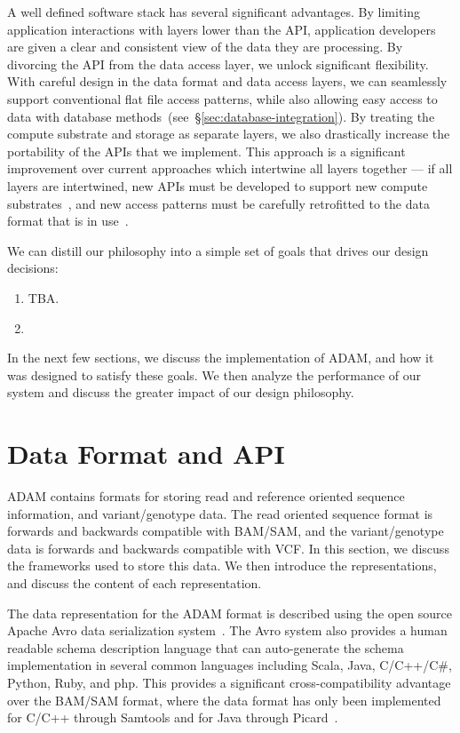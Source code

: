 \documentclass[10pt,twocolumn]{article}
\begin{document}
A well defined software stack has several significant advantages. By limiting application interactions with layers lower than the API,
application developers are given a clear and consistent view of the data they are processing. By divorcing the API from the data
access layer, we unlock significant flexibility. With careful design in the data format and data access layers, we can seamlessly
support conventional flat file access patterns, while also allowing easy access to data with database
methods~(see~\S\ref{sec:database-integration}). By treating the compute substrate and storage as separate layers, we also
drastically increase the portability of the APIs that we implement. This approach is a significant improvement over current approaches
which intertwine all layers together --- if all layers are intertwined, new APIs must be developed to support new compute
substrates~\cite{niemenmaa12}, and new access patterns must be carefully retrofitted to the data format that is in use~\cite{kozanitis13}.

We can distill our philosophy into a simple set of goals that drives our design decisions:

\begin{enumerate}
\item TBA.
\item 
\end{enumerate}

In the next few sections, we discuss the implementation of ADAM, and how it was designed to satisfy these goals. We then
analyze the performance of our system and discuss the greater impact of our design philosophy.

\section{Data Format and API}
\label{sec:data-format-and-api}

ADAM contains formats for storing read and reference oriented sequence information, and variant/genotype data.
The read oriented sequence format is forwards and backwards compatible with BAM/SAM, and the variant/genotype
data is forwards and backwards compatible with VCF. In this section, we discuss the frameworks used to store this
data. We then introduce the representations, and discuss the content of each representation.

The data representation for the ADAM format is described using the open source Apache Avro data serialization
system~\cite{avro}. The Avro system also provides a human readable schema description language that can
auto-generate the schema implementation in several common languages including Scala, Java, C/C++/C\#,
Python, Ruby, and php. This provides a significant cross-compatibility advantage over the BAM/SAM format,
where the data format has only been implemented for C/C++ through Samtools and for Java through
Picard~\cite{li09,picard}.
\end{document}
